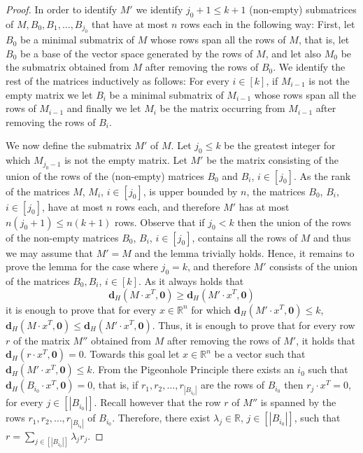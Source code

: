 \documentclass[a4paper,11pt]{article}
\newcommand{\hd}{\textbf{d}_{H}}
\begin{document}
\begin{proof}
In order to identify $M'$ we identify $j_{0}+1\leq k+1$ (non-empty) submatrices of $M,B_{0},B_{1},\dots,B_{j_{0}}$ that have at most $n$ rows each 
 in the following way:
First, let $B_{0}$ be a minimal submatrix of $M$ whose rows span all the rows of $M$, that is, let $B_{0}$ be a base of the 
vector space generated by the rows of $M$, and 
let also $M_{0}$ be the submatrix obtained from $M$ after removing the rows of $B_{0}$.
We identify the rest of the matrices inductively as follows: For every $i\in [k]$, if $M_{i-1}$ is not the empty matrix we let $B_{i}$ 
be a minimal submatrix of $M_{i-1}$ whose rows span all the rows of $M_{i-1}$ and finally we let $M_{i}$ be the matrix occurring 
from $M_{i-1}$ after removing the rows of $B_{i}$.

We now define the submatrix $M'$ of $M$. Let $j_{0}\leq k$ be the greatest integer for which $M_{j_{0}-1}$ is not the empty matrix.
Let $M'$ be the matrix consisting of the union of the rows of the (non-empty) matrices $B_{0}$ and $B_{i}$, $i\in [j_{0}]$. 
As the rank of the matrices $M$, $M_{i}$, $i\in [j_{0}]$, is upper bounded by 
$n$, the matrices $B_{0}$, $B_{i}$, $i\in [j_{0}]$, have at most $n$ rows each, and therefore $M'$ has at most $n(j_{0}+1)\leq n(k+1)$ rows. 
Observe that if $j_{0}<k$ then the union of the rows of the non-empty matrices $B_{0}$, $B_{i}$, $i\in [j_{0}]$,
contains all the rows of $M$ and thus we may assume that $M'=M$ and the lemma trivially holds.
Hence, it remains to prove the lemma for the case where $j_{0}=k$, and therefore $M'$ consists of the union of the matrices $B_{0},B_{i}$, $i\in [k]$.
 As it always holds that 
$$\hd(M\cdot x^{T},\mathbf{0})\geq\hd(M'\cdot x^{T},\mathbf{0})$$ 
it is enough to prove that for every $x\in \mathbb{R}^{n}$ for which 
 $\hd(M'\cdot x^{T},\mathbf{0})\leq k$, $\hd(M\cdot x^{T},\mathbf{0})\leq\hd(M'\cdot x^{T},\mathbf{0})$. Thus, it is enough to prove that for every row $r$ 
 of the matrix $M''$ obtained from $M$ after removing the rows of $M'$, it holds that $\hd(r\cdot x^{T},\mathbf{0})=0$. 
 Towards this goal let $x\in \mathbb{R}^{n}$ be a vector such that $\hd(M'\cdot x^{T},\mathbf{0})\leq k$. 
 From the Pigeonhole Principle there exists an $i_{0}$ such that $\hd(B_{i_{0}}\cdot x^{T},\mathbf{0})=0$,
 that is, if $r_{1},r_{2},\dots,r_{|B_{i_{0}}|}$ are the rows of $B_{i_{0}}$ then $r_{j}\cdot x^{T}=0$, for every $j\in [|B_{i_{0}}|]$.
Recall however that the row $r$ of $M''$ is spanned by the rows $r_{1},r_{2},\dots,r_{|B_{i_{0}}|}$ of $B_{i_{0}}$. 
Therefore, there exist $\lambda_{j}\in \mathbb{R}$, $j\in [|B_{i_{0}}|]$, such that $\displaystyle r=\sum_{j\in [|B_{i_{0}}|]}\lambda_{j}r_{j}$.

\end{proof}
\end{document}
